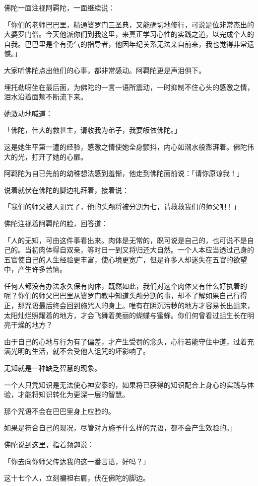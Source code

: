 \documentclass[twoside,openany]{book}
\begin{document}
佛陀一面注视阿羁陀，一面继续说：

「你们的老师巴巴里，精通婆罗门三圣典，又能确切地修行，可说是位非常杰出的大婆罗门僧。今天他派你们到我这里，来真正学习心性的实践之道，以完成个人的自我。巴巴里是个有勇气的指导者，他因年纪关系无法亲自前来，我也觉得非常遗憾。」

大家听佛陀点出他们的心事，都非常感动。阿羁陀更是声泪俱下。

埋托勒呀坐在最后面，为佛陀的一言一语所震动，一时抑制不住心头的感激之情，泪水沿着面颊不断流下来。

她激动地喊道：

「佛陀，伟大的救世主，请收我为弟子，我要皈依佛陀。」

这是她生平第一遭的经验，感激之情使她全身颤抖，内心如潮水般澎湃着。佛陀伟大的光，打开了她的心扉。

阿羁陀为自已先前的幼稚想法感到羞惭，他走到佛陀面前说：「请你原谅我！」

说着就伏在佛陀的脚边礼拜着，接着说：

「我们的师父被人诅咒了，他的头颅将被分割为七，请救救我们的师父吧！」

佛陀注视着阿羁陀的脸，回答道：

「人的无知，可由这件事看出来。肉体是无常的，既可说是自己的，也可说不是自己的。当初肉体得自双亲，等时日一到又将归还大自然。一个人本应当透过己身的五官使自己的人生经验更丰富，使心境更宽广，但是许多人却迷失在五官的欲望中，产生许多苦恼。

任何人都没有办法永久保有肉体，既然如此，我们对这个肉体又有什么好执着的呢？你们的师父巴巴里从婆罗门教中知道头颅分割的事，却不了解如果自己行得正，那咒语最后终会回到施咒人的身上。唯有在阴沉污秽的地方才容易长出蛆来，太阳灿烂照耀着的地方，才会飞舞着美丽的蝴蝶与蜜蜂。你们何曾看过蛆生长在明亮干燥的地方？

由于自己的心地与行为有了偏差，才产生受罚的念头，心行若能守住中道，过着充满光明的生活，就不会受他人诅咒的坏影响了。

无知就是一种缺乏智慧的现象。

一个人只凭知识是无法使心神安泰的，如果将已获得的知识配合上身心的实践与体验，才能将知识转化为更深一层的智慧。

那个咒语不会在巴巴里身上应验的。

如果是符合自己的现况，尽管对方施予什么样的咒语，都不会产生效验的。」

佛陀说到这里，指着频迦说：

「你去向你师父传达我的这一番言语，好吗？」

这十七个人，立刻褊袒右肩，伏在佛陀的脚边。
\end{document}
